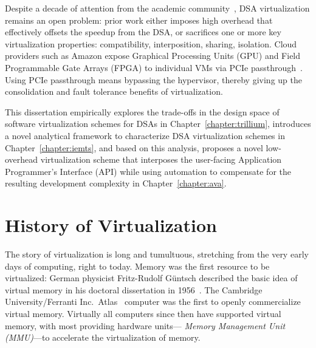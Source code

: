Despite a decade of attention from the academic community~\cite{rossbach16vee,
kaveri16vee,cc-numa-gpu-hpca15, abhishek-ispass16, bitfusion-whitepaper,
kim2012snucl, rCUDAnew, vmCUDA,rCUDA,suzuki2014gpuvm}, DSA virtualization
remains an open problem: prior work either imposes high overhead that
effectively offsets the speedup from the DSA, or sacrifices one or more key
virtualization properties: compatibility, interposition, sharing, isolation.
Cloud providers such as Amazon expose Graphical Processing Units (GPU) and
Field Programmable Gate Arrays (FPGA) to individual VMs via PCIe
passthrough~\cite{AWS-gpu,gVirt}. Using PCIe passthrough means bypassing the
hypervisor, thereby giving up the consolidation and fault tolerance benefits of
virtualization.

This dissertation empirically explores the trade-offs in the design space of
software virtualization schemes for DSAs in Chapter~\ref{chapter:trillium},
introduces a novel analytical framework to characterize DSA virtualization
schemes in Chapter~\ref{chapter:iemts}, and based on this analysis, proposes a
novel low-overhead virtualization scheme that interposes the user-facing
Application Programmer's Interface (API) while using automation to compensate
for the resulting development complexity in Chapter~\ref{chapter:ava}.

\section{History of Virtualization}
The story of virtualization is long and tumultuous, stretching from the very
early days of computing, right to today.
Memory was the first resource to be virtualized:
German physicist Fritz-Rudolf Güntsch described the basic idea of
virtual memory in his doctoral dissertation in 1956~\cite{virtual-memory}.
The Cambridge University/Ferranti Inc.\ Atlas~\cite{atlas-vm} computer was the
first to openly commercialize virtual memory. Virtually all computers since
then have supported virtual memory, with most providing hardware units---\emph{
Memory Management Unit (MMU)}---to accelerate the virtualization of memory.

